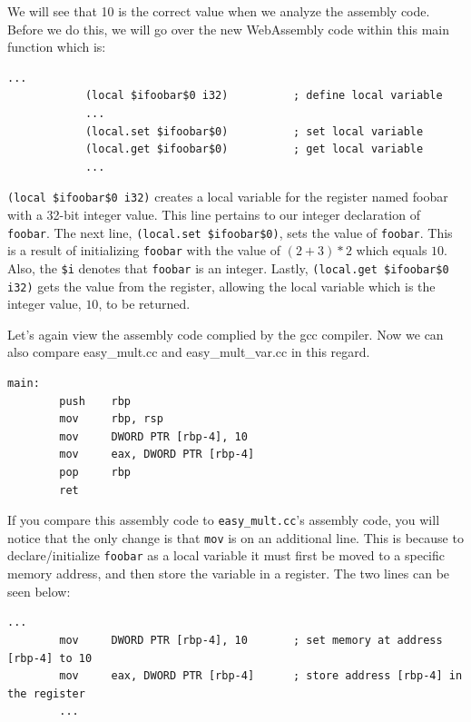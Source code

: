 \documentclass{article}
\theoremstyle{theorem}
\theoremstyle{definition}
\theoremstyle{remark}
\begin{document}
\medskip\noindent
We will see that 10 is the correct value when we analyze the assembly code. Before we do this, we will go over the new WebAssembly code within this main function which is:

\medskip\noindent
\begin{lstlisting}[style=WasmStyle]
            ...
            (local $ifoobar$0 i32)          ; define local variable
            ...
            (local.set $ifoobar$0)          ; set local variable
            (local.get $ifoobar$0)          ; get local variable
            ...
\end{lstlisting}

\medskip\noindent
\verb|(local $ifoobar$0 i32)| creates a local variable for the register named foobar with a 32-bit integer value. This line pertains to our integer declaration of \verb|foobar|. The next line, \verb|(local.set $ifoobar$0)|, sets the value of \verb|foobar|. This is a result of initializing \verb|foobar| with the value of $(2+3)*2$ which equals $10$. Also, the \verb|$i| denotes that \verb|foobar| is an integer. Lastly, \verb|(local.get $ifoobar$0 i32)| gets the value from the register, allowing the local variable which is the integer value, $10$, to be returned.

\medskip\noindent
Let's again view the assembly code complied by the gcc compiler. Now we can also compare easy\_mult.cc and easy\_mult\_var.cc in this regard.

\medskip\noindent
\begin{lstlisting}[style=AsmStyle]
    main:
        push    rbp
        mov     rbp, rsp
        mov     DWORD PTR [rbp-4], 10
        mov     eax, DWORD PTR [rbp-4]
        pop     rbp
        ret
\end{lstlisting}

\medskip\noindent
If you compare this assembly code to \verb|easy_mult.cc|'s assembly code, you will notice that the only change is that \verb|mov| is on an additional line. This is because to declare/initialize \verb|foobar| as a local variable it must first be moved to a specific memory address, and then store the variable in a register. The two lines can be seen below:

\medskip\noindent
\begin{lstlisting}[style=AsmStyle]
        ...
        mov     DWORD PTR [rbp-4], 10       ; set memory at address [rbp-4] to 10
        mov     eax, DWORD PTR [rbp-4]      ; store address [rbp-4] in the register
        ...
\end{lstlisting}
\end{document}
